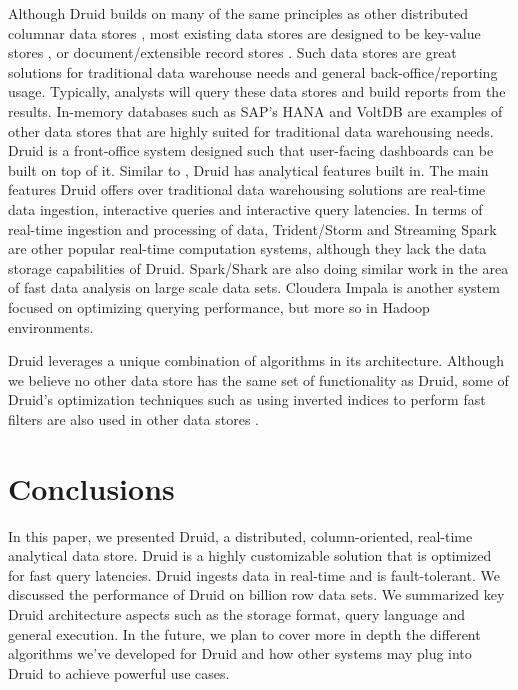 \documentclass{vldb}
\begin{document}
Although Druid builds on many of the same principles as other
distributed columnar data stores \cite{fink2012distributed}, most existing data
stores are designed to be key-value stores \cite{lerner2010redis}, or
document/extensible record stores \cite{stonebraker2005c}. Such data stores are great
solutions for traditional data warehouse needs and general
back-office/reporting usage. Typically, analysts will query these data
stores and build reports from the results. In-memory databases such as
SAP’s HANA \cite{farber2012sap} and VoltDB \cite{voltdb2010voltdb} are examples of other data stores that
are highly suited for traditional data warehousing needs. Druid is a
front-office system designed such that user-facing dashboards can be
built on top of it. Similar to \cite{paraccel2013}, Druid has analytical features
built in. The main features Druid offers over traditional data
warehousing solutions are real-time data ingestion, interactive
queries and interactive query latencies. In terms of real-time
ingestion and processing of data, Trident/Storm \cite{marz2013storm} and Streaming
Spark \cite{zaharia2012discretized} are other popular real-time computation systems, although
they lack the data storage capabilities of Druid. Spark/Shark \cite{engle2012shark} are
also doing similar work in the area of fast data analysis on large
scale data sets. Cloudera Impala \cite{cloudera2013} is another system focused on
optimizing querying performance, but more so in Hadoop environments.

Druid leverages a unique combination of algorithms in its
architecture. Although we believe no other data store has the same set
of functionality as Druid, some of Druid’s optimization techniques such as using
inverted indices to perform fast filters are also used in other data
stores \cite{macnicol2004sybase}.

\section{Conclusions}
\label{sec:conclusions}
In this paper, we presented Druid, a distributed, column-oriented,
real-time analytical data store. Druid is a highly customizable
solution that is optimized for fast query latencies. Druid ingests
data in real-time and is fault-tolerant. We discussed the performance
of Druid on billion row data sets. We summarized key Druid architecture
aspects such as the storage format, query language and general
execution. In the future, we plan to cover more in depth the different
algorithms we’ve developed for Druid and how other systems may plug
into Druid to achieve powerful use cases.
\end{document}
